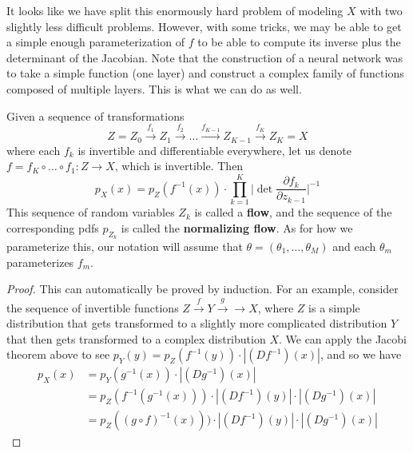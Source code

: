   It looks like we have split this enormously hard problem of modeling $X$ with two slightly less difficult problems. However, with some tricks, we may be able to get a simple enough parameterization of $f$ to be able to compute its inverse plus the determinant of the Jacobian. Note that the construction of a neural network was to take a simple function (one layer) and construct a complex family of functions composed of multiple layers. This is what we can do as well. 

  \begin{corollary}
    Given a sequence of transformations 
    \begin{equation}
      Z = Z_0 \xrightarrow{f_1} Z_1 \xrightarrow{f_2} \ldots \xrightarrow{f_{K-1}} Z_{K-1} \xrightarrow{f_K} Z_K = X
    \end{equation} 
    where each $f_k$ is invertible and differentiable everywhere, let us denote $f = f_K \circ \ldots \circ f_1: Z \rightarrow X$, which is invertible. Then
    \begin{equation}
      p_X (x) = p_Z (f^{-1} (x)) \cdot \prod_{k=1}^K \bigg| \det \frac{\partial f_k}{ \partial z_{k-1}} \bigg|^{-1}
    \end{equation}
    This sequence of random variables $Z_k$ is called a \textbf{flow}, and the sequence of the corresponding pdfs $p_{Z_k}$ is called the \textbf{normalizing flow}. As for how we parameterize this, our notation will assume that $\theta = (\theta_1, \ldots, \theta_M)$ and each $\theta_m$ parameterizes $f_m$.
  \end{corollary} 
  \begin{proof}
    This can automatically be proved by induction. For an example, consider the sequence of invertible functions $Z \xrightarrow{f} Y \xrightarrow{g} \rightarrow X$, where $Z$ is a simple distribution that gets transformed to a slightly more complicated distribution $Y$ that then gets transformed to a complex distribution $X$. We can apply the Jacobi theorem above to see $p_Y (y) = p_Z (f^{-1} (y)) \cdot | (Df^{-1})(x)|$, and so we have 
    \begin{align}
      p_X (x) & = p_Y (g^{-1} (x)) \cdot | (D g^{-1}) (x) | \\
              & = p_Z (f^{-1} (g^{-1} (x))) \cdot | (Df^{-1}) (y)| \cdot | (D g^{-1}) (x) | \\ 
              & = p_Z ((g \circ f)^{-1} (x))) \cdot | (Df^{-1}) (y)| \cdot | (D g^{-1}) (x) | 
    \end{align}
  \end{proof}

